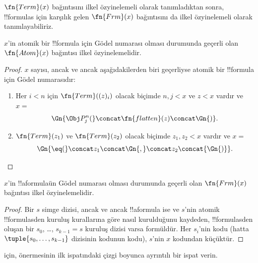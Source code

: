 


$\fn{Term}(x)$ bağıntısını ilkel özyinelemeli olarak tanımladıktan sonra,
!!{formula}s için karşılık gelen $\fn{Frm}(x)$ bağıntısını da ilkel
özyinelemeli olarak tanımlayabiliriz.

\begin{prop}
$x$'in atomik bir !!{formula} için Gödel numarası olması durumunda geçerli olan
$\fn{Atom}(x)$ bağıntısı ilkel özyinelemelidir.
\end{prop}

\begin{proof}
$x$ sayısı, ancak ve ancak aşağıdakilerden biri geçerliyse atomik bir
!!{formula} için Gödel numarasıdır:
\begin{enumerate}
\item Her $i<n$ için $\fn{Term}((z)_i)$ olacak biçimde $n,j<x$ ve $z<x$
  vardır ve $x=$
\[
\Gn{\Obj P^n_j(} \concat \fn{flatten}(z) \concat \Gn{)}.
\]
\item $\fn{Term}(z_1)$ ve $\fn{Term}(z_2)$ olacak biçimde $z_1,z_2<x$
  vardır ve $x=$
\[
\Gn{{\eq}(} \concat z_1 \concat \Gn{,} \concat z_2 \concat{\Gn{)}}.
\]
\end{enumerate}
\end{proof}

\begin{prop}
$x$'in !!a{formula}{}ün Gödel numarası olması durumunda geçerli olan
$\fn{Frm}(x)$ bağıntısı ilkel özyinelemelidir.
\end{prop}

\begin{proof}
Bir $s$ simge dizisi, ancak ve ancak !!a{formula} ise ve $s$'nin atomik
!!{formula}s{}den kuruluş kurallarına göre nasıl kurulduğunu kaydeden,
!!{formula}s{}den oluşan bir $s_0$, \dots, $s_{k-1}=s$ kuruluş dizisi varsa
formüldür. Her $s_i$'nin
kodu (hatta $\tuple{s_0,\dots,s_{k-1}}$ dizisinin kodunun kodu), $s$'nin
$x$ kodundan küçüktür.
\end{proof}

\begin{prob}
 için,
 önermesinin ilk ispatındaki çizgi
boyunca ayrıntılı bir ispat
verin.
\end{prob}

